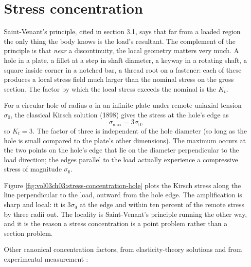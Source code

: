 \section{Stress concentration}

Saint-Venant's principle, cited in section 3.1, says that far from a
loaded region the only thing the body knows is the load's resultant.
The complement of the principle is that \emph{near} a discontinuity,
the local geometry matters very much. A hole in a plate, a fillet at
a step in shaft diameter, a keyway in a rotating shaft, a square
inside corner in a notched bar, a thread root on a fastener: each
of these produces a local stress field much larger than the nominal
stress on the gross section. The factor by which the local stress
exceeds the nominal is the 
$K_t$.

For a circular hole of radius $a$ in an infinite plate under remote
uniaxial tension $\sigma_0$, the classical Kirsch solution (1898)
gives the stress at the hole's edge as
\[
\sigma_{\max} = 3 \sigma_0,
\]
so $K_t = 3$. The factor of three is independent of the hole
diameter (so long as the hole is small compared to the plate's other
dimensions). The maximum occurs at the two points on the hole's edge
that lie on the diameter perpendicular to the load direction; the
edges parallel to the load actually experience a compressive stress
of magnitude $\sigma_0$.



Figure \ref{fig:vol03ch03:stress-concentration-hole} plots the Kirsch
stress along the line perpendicular to the load, outward from the hole
edge. The amplification is sharp and local: it is $3\sigma_0$ at the
edge and within ten percent of the remote stress by three radii out.
The locality is Saint-Venant's principle running the other way, and it
is the reason a stress concentration is a point problem rather than a
section problem.

Other canonical concentration factors, from elasticity-theory
solutions and from experimental measurement
\cite[appendices]{text:crandall-mech-of-solids}:

